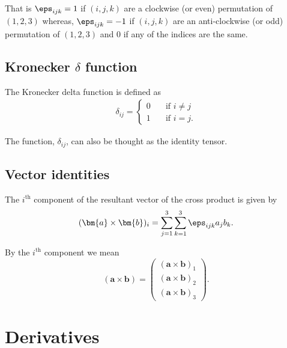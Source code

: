 \documentclass[12pt, a4paper]{article}
\begin{document}
\begin{mdnote}
    That is \(\eps_{ijk}=1\) if \((i,j,k)\) are a clockwise (or even) permutation of \((1,2,3)\) whereas, \(\eps_{ijk}=-1\) if \((i,j,k)\) are an anti-clockwise (or odd) permutation of \((1,2,3)\) and \(0\) if any of the indices are the same.
\end{mdnote}

\subsection{Kronecker \texorpdfstring{\(\delta\)}{TEXT} function}

\begin{definition}
    The Kronecker delta function is defined as
    \[\begin{aligned}
        \delta_{ij} = \begin{cases}
            0 \quad &\text{if } i \neq j \\
            1 \quad &\text{if } i =j.
        \end{cases}
    \end{aligned}\]
\end{definition}

\begin{mdnote}
    The function, \(\delta_{ij}\), can also be thought as the identity tensor.
\end{mdnote}

\subsection{Vector identities}

\begin{mdthm}
    The \(i^{\text{th}}\) component of the resultant vector of the cross product is given by 
    \[(\bm{a} \times \bm{b})_i = \sum_{j=1}^{3} \sum_{k=1}^{3} \eps_{ijk} a_j b_k.\]
\end{mdthm}

\begin{mdnote}
    By the \(i^{\text{th}}\) component we mean 
    \[(\bm{a} \times \bm{b}) = 
    \begin{pmatrix}
        (\bm{a} \times \bm{b})_1 \\
        (\bm{a} \times \bm{b})_2 \\
        (\bm{a} \times \bm{b})_3
    \end{pmatrix}.\]
\end{mdnote}

\section{Derivatives}
\end{document}
